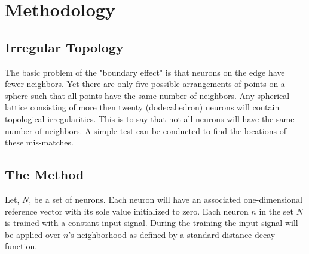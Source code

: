 \documentclass[12pt]{article}
\begin{document}

\section{Methodology}
\subsection{Irregular Topology}
The basic problem of the "boundary effect" is that neurons on the edge have fewer neighbors. Yet there are only five possible arrangements of points on a sphere such that all points have the same number of neighbors.  Any spherical lattice consisting of more then twenty (dodecahedron) neurons will contain topological irregularities.  This is to say that not all neurons will have the same number of neighbors.  A simple test can be conducted to find the locations of these mis-matches.

\subsection{The Method}
Let, \begin{math}N\end{math}, be a set of neurons.  Each neuron will have an
associated one-dimensional reference vector with its sole value initialized to
zero. Each neuron \(n\) in the set \(N\) is trained with a constant input signal.  During the training
the input signal will be applied over \(n\)'s neighborhood as defined by a standard distance decay function.
\end{document}
